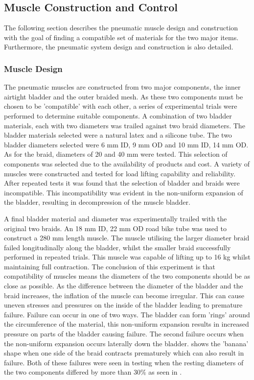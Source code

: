\documentclass[11pt,a4paper]{article}
\begin{document}
\subsection{Muscle Construction and Control}
\label{sub:muscle_construction}

The following section describes the pneumatic muscle design and construction with the goal of finding a compatible set of materials for the two major items. Furthermore, the pneumatic system design and construction is also detailed.

\subsubsection{Muscle Design}
\label{subsubsection:muscle_design}
The pneumatic muscles are constructed from two major components, the inner airtight bladder and the outer braided mesh. As these two components must be chosen to be 'compatible' with each other, a series of experimental trials were performed to determine suitable components. A combination of two bladder materials, each with two diameters was trailed against two braid diameters. The bladder materials selected were a natural latex and a silicone tube. The two bladder diameters selected were 6 mm ID, 9 mm OD and 10 mm ID, 14 mm OD. As for the braid, diameters of 20 and 40 mm were tested. This selection of components was selected due to the availability of products and cost. A variety of muscles were constructed and tested for load lifting capability and reliability. After repeated tests it was found that the selection of bladder and braids were incompatible. This incompatibility was evident in the non-uniform expansion of the bladder, resulting in decompression of the muscle bladder. \newline

A final bladder material and diameter was experimentally trailed with the original two braids. An 18 mm ID, 22 mm OD road bike tube was used to construct a 280 mm length muscle. The muscle utilising the larger diameter braid failed longitudinally along the bladder, whilst the smaller braid successfully performed in repeated trials. This muscle was capable of lifting up to 16 kg whilst maintaining full contraction.\newline
The conclusion of this experiment is that compatibility of muscles means the diameters of the two components should be as close as possible. As the difference between the diameter of the bladder and the braid increases, the inflation of the muscle can become irregular. This can cause uneven stresses and pressures on the inside of the bladder leading to premature failure. Failure can occur in one of two ways. The bladder can form 'rings'  around the circumference of the material, this non-uniform expansion results in increased pressure on parts of the bladder causing failure. The second failure occurs when the non-uniform expansion occurs laterally down the bladder.  shows the 'banana' shape when one side of the braid contracts prematurely which can also result in failure. Both of these failures were seen in testing when the resting diameters of the two components differed by more than $30\%$ as seen in .
\end{document}
